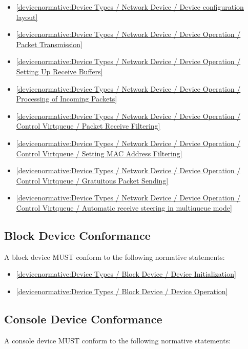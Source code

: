 \begin{itemize}
\item \ref{devicenormative:Device Types / Network Device / Device configuration layout}
\item \ref{devicenormative:Device Types / Network Device / Device Operation / Packet Transmission}
\item \ref{devicenormative:Device Types / Network Device / Device Operation / Setting Up Receive Buffers}
\item \ref{devicenormative:Device Types / Network Device / Device Operation / Processing of Incoming Packets}
\item \ref{devicenormative:Device Types / Network Device / Device Operation / Control Virtqueue / Packet Receive Filtering}
\item \ref{devicenormative:Device Types / Network Device / Device Operation / Control Virtqueue / Setting MAC Address Filtering}
\item \ref{devicenormative:Device Types / Network Device / Device Operation / Control Virtqueue / Gratuitous Packet Sending}
\item \ref{devicenormative:Device Types / Network Device / Device Operation / Control Virtqueue / Automatic receive steering in multiqueue mode}
\end{itemize}

\subsection{Block Device Conformance}\label{sec:Conformance / Device Conformance / Block Device Conformance}

A block device MUST conform to the following normative statements:

\begin{itemize}
\item \ref{devicenormative:Device Types / Block Device / Device Initialization}
\item \ref{devicenormative:Device Types / Block Device / Device Operation}
\end{itemize}

\subsection{Console Device Conformance}\label{sec:Conformance / Device Conformance / Console Device Conformance}

A console device MUST conform to the following normative statements:

